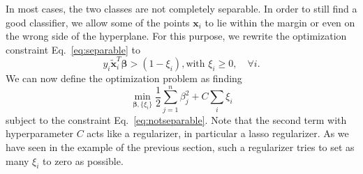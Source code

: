 In most cases, the two classes are not completely separable. In order to still find a good classifier, we allow some of the points $\bm{x}_i$ to lie within the margin or even on the wrong side of the hyperplane. For this purpose, we rewrite the optimization constraint Eq.~\eqref{eq:separable} to  
\begin{equation}
  y_i \tilde{\bm{x}}_i^T\bm{\beta} > (1-\xi_i), \textrm{with } \xi_i \geq 0, \quad \forall i.
  \label{eq:notseparable}
\end{equation}
We can now define the optimization problem as finding 
\begin{equation}
  \min_{\bm{\beta},\{\xi_i\}} \frac12 \sum_{j=1}^{n} \beta_j^2 + C\sum_i \xi_i
  \label{eq:optimalclassifierbeta}
\end{equation}
subject to the constraint Eq.~\eqref{eq:notseparable}. Note that the second term with hyperparameter $C$ acts like a regularizer, in particular a lasso regularizer. As we have seen in the example of the previous section, such a regularizer tries to set as many $\xi_i$ to zero as possible.

